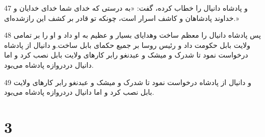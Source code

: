 \par 47 و پادشاه دانیال را خطاب کرده، گفت: «به درستی که خدای شما خدای خدایان و خداوند پادشاهان و کاشف اسرار است، چونکه تو قادر بر کشف این رازشده‌ای.»
\par 48 پس پادشاه دانیال را معظم ساخت وهدایای بسیار و عظیم به او داد و او را بر تمامی ولایت بابل حکومت داد و رئیس روسا بر جمیع حکمای بابل ساخت.و دانیال از پادشاه درخواست نمود تا شدرک و میشک و عبدنغو رابر کارهای ولایت بابل نصب کرد و اما دانیال دردروازه پادشاه می‌بود.
\par 49 و دانیال از پادشاه درخواست نمود تا شدرک و میشک و عبدنغو رابر کارهای ولایت بابل نصب کرد و اما دانیال دردروازه پادشاه می‌بود.

\chapter{3}

